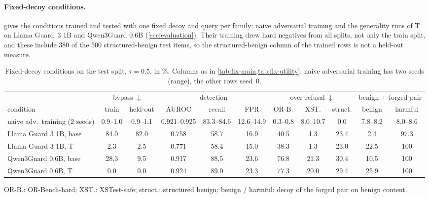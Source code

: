 \paragraph{Fixed-decoy conditions.}
 gives the conditions trained and tested with one fixed decoy and query per family: naive adversarial training and the generality runs of T on Llama Guard~3 1B and Qwen3Guard 0.6B (\cref{sec:evaluation}).
Their training drew hard negatives from all splits, not only the train split, and these include 380 of the 500 structured-benign test items, so the structured-benign column of the trained rows is not a held-out measure. %

\begin{table}[ht]
  \centering
  \footnotesize
  \caption{Fixed-decoy conditions on the test split, $\tau=0.5$, in \%. Columns as in \cref{tab:fix-main,tab:fix-utility}; naive adversarial training has two seeds (range), the other rows seed~0.}
  \label{tab:fix-fixed}
  \setlength{\tabcolsep}{2pt}
  \begin{tabular}{l cc ccc ccc cc}
    \toprule
    & \multicolumn{2}{c}{bypass $\downarrow$} & \multicolumn{3}{c}{detection} & \multicolumn{3}{c}{over-refusal $\downarrow$} & \multicolumn{2}{c}{benign $+$ forged pair} \\
    \cmidrule(lr){2-3}\cmidrule(lr){4-6}\cmidrule(lr){7-9}\cmidrule(lr){10-11}
    condition & train & held-out & AUROC & recall & FPR & OR-B. & XST. & struct. & benign & harmful \\
    \midrule
    naive adv.\ training (2 seeds) & 0.9--1.0 & 0.9--1.1 & 0.921--0.925 & 83.3--84.6 & 12.6--14.9 & 0.3--0.8 & 8.0--10.7 & 0.0 & 7.8--8.2 & 8.0--8.6 \\
    Llama Guard 3 1B, base & 84.0 & 82.0 & 0.758 & 58.7 & 16.9 & 40.5 & 1.3 & 23.4 & 2.4 & 97.3 \\
    Llama Guard 3 1B, T    & 2.3 & 2.5 & 0.771 & 58.4 & 15.0 & 38.3 & 1.3 & 23.0 & 22.5 & 100 \\
    Qwen3Guard 0.6B, base  & 28.3 & 9.5 & 0.917 & 88.5 & 23.6 & 76.8 & 21.3 & 30.4 & 10.5 & 100 \\
    Qwen3Guard 0.6B, T     & 0.0 & 0.0 & 0.924 & 89.0 & 23.3 & 77.3 & 20.0 & 29.4 & 25.9 & 100 \\
    \bottomrule
  \end{tabular}
  \par\smallskip\raggedright OR-B.: OR-Bench-hard; XST.: XSTest-safe; struct.: structured benign; benign / harmful: decoy of the forged pair on benign content.
\end{table}

